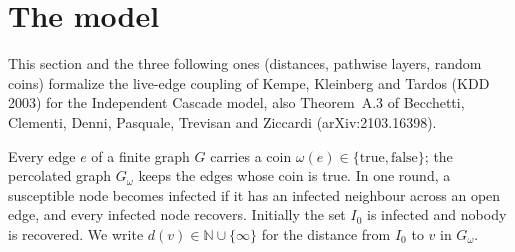 \begin{abstract}
We also formalize the upper bounds of Doerr and Kostrygin's analysis of general rumor-spreading
processes (\emph{Randomized rumor spreading revisited}, ICALP 2017): the exponential growth and
shrinking regimes and the total spreading time $\log_{1+\gamma}n+\frac1\rho\ln n+O(1)$, with
exponential tails. For Lemma~20 of that paper we formalize the one-round estimate of its proof
and a path statement that also counts the rounds spent below the threshold.

We also formalize the duality between the coalescing-branching random walk (COBRA) and the BIPS
epidemic of Cooper, Radzik and Rivera (Theorem~4), pathwise and by time reversal of i.i.d.\ rounds,
and their bounds on the COBRA cover time on regular expanders: $O(\log n/(1-\lambda)^3)$ when
$1-\lambda\ge C_0\sqrt{\log n/n}$ (Theorems~1 and~2), and $O(\log n)$ with branching factor
$1+\rho$ for constant $\lambda<1$ and $\rho>0$ (Theorem~3), with high probability and in
expectation.
\end{abstract}

\section{The model}\label{sec:kkt-live-edge}
This section and the three following ones (distances, pathwise layers, random coins) formalize
the live-edge coupling of Kempe, Kleinberg and Tardos (KDD 2003) for the Independent Cascade
model, also Theorem~A.3 of Becchetti, Clementi, Denni, Pasquale, Trevisan and Ziccardi
(arXiv:2103.16398).

\begin{definition}\label{def:reedfrost}
\leanok
Every edge $e$ of a finite graph $G$ carries a coin $\omega(e)\in\{\mathrm{true},\mathrm{false}\}$;
the percolated graph $G_\omega$ keeps the edges whose coin is true. In one round, a susceptible node
becomes infected if it has an infected neighbour across an open edge, and every infected node
recovers. Initially the set $I_0$ is infected and nobody is recovered. We write $d(v)\in\mathbb N\cup\{\infty\}$
for the distance from $I_0$ to $v$ in $G_\omega$.
\end{definition}

